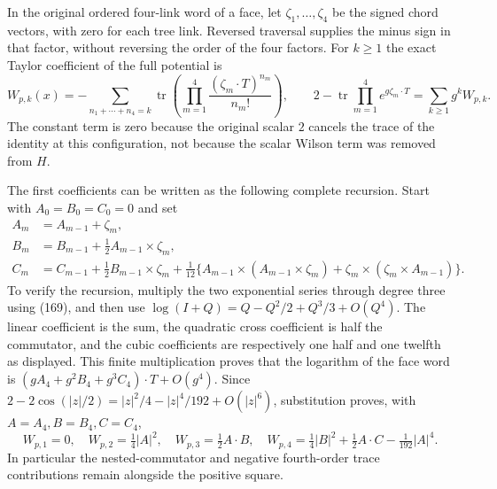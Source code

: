 \documentclass[11pt]{article}
\newcommand{\tr}{\operatorname{tr}}
\begin{document}
In the original ordered four-link word of a face, let
$\zeta_1,\ldots,\zeta_4$ be the signed chord vectors, with zero
for each tree link. Reversed traversal supplies the minus sign in
that factor, without reversing the order of the four factors.
For $k\ge1$ the exact Taylor coefficient of the full potential is
\begin{equation}\label{eq:vertex-Wk}
 W_{p,k}(x)=-\sum_{n_1+\cdots+n_4=k}
       \tr\!\left(\prod_{m=1}^4
                   \frac{(\zeta_m\cdot T)^{n_m}}{n_m!}\right),
 \qquad 2-\tr\prod_{m=1}^4 e^{g\zeta_m\cdot T}
           =\sum_{k\ge1}g^kW_{p,k}.
\end{equation}
The constant term is zero because the original scalar $2$ cancels
the trace of the identity at this configuration, not because the
scalar Wilson term was removed from $H$.

The first coefficients can be written as the following complete
recursion. Start with $A_0=B_0=C_0=0$ and set
\begin{align}
 A_m&=A_{m-1}+\zeta_m,\nonumber\\
 B_m&=B_{m-1}+\tfrac12 A_{m-1}\times\zeta_m,\nonumber\\
 C_m&=C_{m-1}+\tfrac12 B_{m-1}\times\zeta_m
   +\tfrac1{12}\{A_{m-1}\times(A_{m-1}\times\zeta_m)
          +\zeta_m\times(\zeta_m\times A_{m-1})\}.
       \label{eq:vertex-BCH}
\end{align}
To verify the recursion, multiply the two exponential series through
degree three using (169), and then use
$\log(I+Q)=Q-Q^2/2+Q^3/3+O(Q^4)$. The linear coefficient is the
sum, the quadratic cross coefficient is half the commutator, and
the cubic coefficients are respectively one half and one twelfth
as displayed. This finite multiplication proves that the logarithm
of the face word is $(gA_4+g^2B_4+g^3C_4)\cdot T+O(g^4)$.
Since $2-2\cos(|z|/2)=|z|^2/4-|z|^4/192+O(|z|^6)$, substitution
proves, with $A=A_4,B=B_4,C=C_4$,
\begin{equation}\label{eq:vertex-W234}
 W_{p,1}=0,\quad W_{p,2}=\tfrac14|A|^2,\quad
 W_{p,3}=\tfrac12 A\cdot B,\quad
 W_{p,4}=\tfrac14|B|^2+\tfrac12 A\cdot C-\tfrac1{192}|A|^4.
\end{equation}
In particular the nested-commutator and negative fourth-order
trace contributions remain alongside the positive square.
\end{document}
